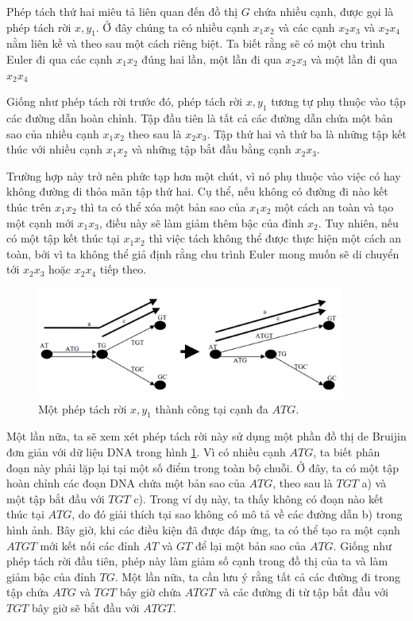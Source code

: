 \documentclass[14pt, a4paper]{article}
\numberwithin{equation}{section}
\numberwithin{figure}{section}
\numberwithin{dl}{section}
\numberwithin{md}{section}
\numberwithin{bd}{section}
\numberwithin{dn}{section}
\numberwithin{hq}{section}
\begin{document}
    Phép tách thứ hai miêu tả liên quan đến đồ thị $G$ chứa nhiều cạnh, được gọi là phép tách rời $x, y_1$.
    Ở đây chúng ta có nhiều cạnh $x_1 x_2$ và các cạnh $x_2 x_3$ và $x_2 x_4$ nằm liên kề và theo sau một cách riêng biệt.
    Ta biết rằng sẽ có một chu trình Euler đi qua các cạnh $x_1 x_2$ đúng hai lần, một lần đi qua $x_2 x_3$ và một lần đi qua $x_2 x_4$

    Giống như phép tách rời trước đó, phép tách rời $x, y_1$ tương tự phụ thuộc vào tập các đường dẫn hoàn chỉnh.
    Tập đầu tiên là tất cả các đường dẫn chứa một bản sao của nhiều cạnh $x_1 x_2$ theo sau là $x_2 x_3$.
    Tập thứ hai và thứ ba là những tập kết thúc với nhiều cạnh $x_1 x_2$ và những tập bắt đầu bằng cạnh $x_2 x_3$.

    Trường hợp này trở nên phức tạp hơn một chút, vì nó phụ thuộc vào việc có hay không đường đi thỏa mãn tập thứ hai.
    Cụ thể, nếu không có đường đi nào kết thúc trên $x_1 x_2$ thì ta có thể xóa một bản sao của $x_1 x_2$ một cách an toàn và tạo một cạnh mới $x_1 x_3$, điều này sẽ làm giảm thêm bậc của đỉnh $x_2$.
    Tuy nhiên, nếu có một tập kết thúc tại $x_1 x_2$ thì việc tách không thể được thực hiện một cách an toàn, bởi vì ta không thể giả định rằng chu trình Euler mong muốn sẽ di chuyển tới $x_2 x_3$ hoặc $x_2 x_4$ tiếp theo.

    \begin{figure}[h!]
        \centering
        \includegraphics[width=0.9\textwidth]{7.png}
        \caption{Một phép tách rời $x, y_1$ thành công tại cạnh đa $ATG$.}
        \label{fig:7}
    \end{figure}

    Một lần nữa, ta sẽ xem xét phép tách rời này sử dụng một phần đồ thị de Bruijin đơn giản với dữ liệu DNA trong hình \ref{fig:7}.
    Vì có nhiều cạnh $ATG$, ta biết phân đoạn này phải lặp lại tại một số điểm trong toàn bộ chuỗi. Ở đây, ta có một tập hoàn chỉnh các đoạn DNA chứa một bản sao của $ATG$, theo sau là $TGT$ a) và một tập bắt đầu với $TGT$ c).
    Trong ví dụ này, ta thấy không có đoạn nào kết thúc tại $ATG$, do đó giải thích tại sao không có mô tả về các đường dẫn b) trong hình ảnh.
    Bây giờ, khi các điều kiện đã được đáp ứng, ta có thể tạo ra một cạnh $ATGT$ mới kết nối các đỉnh $AT$ và $GT$ để lại một bản sao của $ATG$.
    Giống như phép tách rời đầu tiên, phép này làm giảm số cạnh  trong đồ thị của ta và làm giảm bậc của đỉnh $TG$.
    Một lần nữa, ta cần lưu ý rằng tất cả các đường đi trong tập chứa $ATG$ và $TGT$ bây giờ chứa $ATGT$ và các đường đi từ tập bắt đầu với $TGT$ bây giờ sẽ bắt đầu với $ATGT$.
\end{document}
